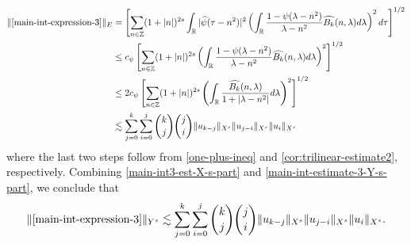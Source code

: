 \documentclass[12pt,reqno]{amsart}
\numberwithin{equation}{section}  %
\numberwithin{figure}{section}
\newcommand{\rr}{\mathbb{R}}
\newcommand{\zz}{\mathbb{Z}}
\newcommand{\wh}{\widehat}
\theoremstyle{plain}
\theoremstyle{definition}
\theoremstyle{remark}
\begin{document}
\begin{equation}
  \label{main-int-estimate-3-Y-s-part}
  \begin{split}
    \|\eqref{main-int-expression-3}\|_{E}
    & = \left[ \sum_{n \in \zz} (1 + | n |)^{2s} \int_{\rr} |
    \wh{\psi}(\tau - n^{2}) |^{2} \left( \int_{\rr}\frac{1 - \psi(\lambda -
    n^{2})}{\lambda - n^{2}} \wh{{B_k}}(n, \lambda) d \lambda \right)^{2} d \tau
    \right]^{1/2}
    \\
    & \le c_{\psi} \left[ \sum_{n \in \zz} (1 + | n |)^{2s} \left(
    \int_{\rr} \frac{1 - \psi(\lambda - n^{2})}{\lambda - n^{2}}
    \wh{{B_k}}(n, \lambda) d \lambda
    \right)^{2}\right]^{1/2}
    \\
    & \le 2 c_{\psi} \left[ \sum_{n \in \zz} (1 + | n |)^{2s} \left(
    \int_{\rr} \frac{\wh{{B_k}}(n, \lambda) }{1 + |\lambda - n^{2}|}
    d \lambda
    \right)^{2}\right]^{1/2}
    \\
    & \lesssim 
    \sum_{j=0}^{k} \sum_{i=0}^{j} {k \choose j}{j \choose i}
    \|u_{k-j}\|_{X^s} \| u_{j-i}\|_{X^s}
    \| u_i \|_{X^s}
  \end{split}
\end{equation}
%
%
where the last two steps follow from \eqref{one-plus-ineq} and
\autoref{cor:trilinear-estimate2}, respectively. Combining
\eqref{main-int3-est-X-s-part} and \eqref{main-int-estimate-3-Y-s-part}, we
conclude that
%
%
\begin{equation}
  \label{main-int3-est}
  \begin{split}
    \|\eqref{main-int-expression-3}\|_{Y^s} 
    \lesssim \sum_{j=0}^{k} \sum_{i=0}^{j} {k \choose j}{j \choose i}
    \|u_{k-j}\|_{X^s} \| u_{j-i}\|_{X^s}
    \| u_i \|_{X^s}.
  \end{split}
\end{equation}
%
%
%
\end{document}
